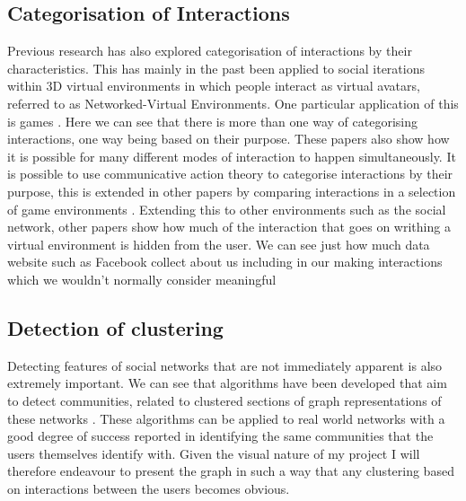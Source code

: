 \documentclass[12pt,a4paper]{article}
\begin{document}
\subsection{Categorisation of Interactions}
Previous research has also explored categorisation of interactions by their characteristics. This has mainly in the past been applied to social iterations within 3D virtual environments in which people interact as virtual avatars, referred to as Networked-Virtual Environments. One particular application of this is games \cite{manninen2000interaction}. Here we can see that there is more than one way of categorising interactions, one way being based on their purpose. These papers also show how it is possible for many different modes of interaction to happen simultaneously. It is possible to use communicative action theory to categorise interactions by their purpose, this is extended in other papers by comparing interactions in a selection of game environments \cite{becker2002social}. Extending this to other environments such as the social network, other papers show how much of the interaction that goes on writhing a virtual environment is hidden from the user. We can see just how much data website such as Facebook collect about us including in our making interactions which we wouldn't normally consider meaningful \cite{schneier2010taxonomy}


\subsection{Detection of clustering}
Detecting features of social networks that are not immediately apparent is also extremely important. We can see that algorithms have been developed that aim to detect communities, related to clustered sections of graph representations of these networks \cite{newman2004fast}. These algorithms can be applied to real world networks with a good degree of success reported in identifying the same communities that the users themselves identify with. Given the visual nature of my project I will therefore endeavour to present the graph in such a way that any clustering based on interactions between the users becomes obvious.
\end{document}

